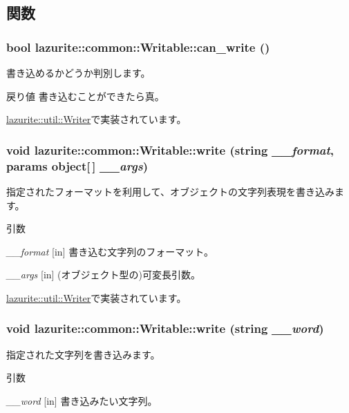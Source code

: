\subsection{関数}
\hypertarget{interfacelazurite_1_1common_1_1_writable_ab08924bf9f4359d839e406135541b1b1}{
\subsubsection[{can\_\-write}]{\setlength{\rightskip}{0pt plus 5cm}bool lazurite::common::Writable::can\_\-write ()}}
\label{interfacelazurite_1_1common_1_1_writable_ab08924bf9f4359d839e406135541b1b1}
書き込めるかどうか判別します。 \begin{DoxyReturn}{戻り値}
書き込むことができたら真。 
\end{DoxyReturn}


\hyperlink{classlazurite_1_1util_1_1_writer_a2bf9621aaa39def983069d70c09e5c6a}{lazurite::util::Writer}で実装されています。\hypertarget{interfacelazurite_1_1common_1_1_writable_a3f0f9f537e8a8b3fa86bb13fea5ebef7}{
\subsubsection[{write}]{\setlength{\rightskip}{0pt plus 5cm}void lazurite::common::Writable::write (string {\em \_\-\_\-format}, \/  params object\mbox{[}$\,$\mbox{]} {\em \_\-\_\-args})}}
\label{interfacelazurite_1_1common_1_1_writable_a3f0f9f537e8a8b3fa86bb13fea5ebef7}
指定されたフォーマットを利用して、オブジェクトの文字列表現を書き込みます。 
\begin{DoxyParams}{引数}
\item[{\em \_\-\_\-format}]\mbox{[}in\mbox{]} 書き込む文字列のフォーマット。 \item[{\em \_\-\_\-args}]\mbox{[}in\mbox{]} (オブジェクト型の)可変長引数。 \end{DoxyParams}


\hyperlink{classlazurite_1_1util_1_1_writer_ae7beb36247424b99646f4b557fcafa59}{lazurite::util::Writer}で実装されています。\hypertarget{interfacelazurite_1_1common_1_1_writable_a3e89b67f8716f5b22cdae02e2e552706}{
\subsubsection[{write}]{\setlength{\rightskip}{0pt plus 5cm}void lazurite::common::Writable::write (string {\em \_\-\_\-word})}}
\label{interfacelazurite_1_1common_1_1_writable_a3e89b67f8716f5b22cdae02e2e552706}
指定された文字列を書き込みます。 
\begin{DoxyParams}{引数}
\item[{\em \_\-\_\-word}]\mbox{[}in\mbox{]} 書き込みたい文字列。 \end{DoxyParams}


